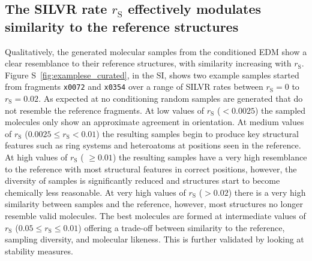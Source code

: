 \documentclass[journal=jacsat,manuscript=article]{achemso}
\begin{document}
\subsection{The SILVR rate $r_{\mathrm{S}}$ effectively modulates similarity to the reference structures}
Qualitatively, the generated molecular samples from the conditioned EDM  show a clear resemblance to their reference structures, with similarity increasing with $r_{\mathrm{S}}$. Figure S~\ref{fig:examplese_curated}, in the SI, shows two example samples started from fragments \texttt{x0072} and \texttt{x0354} over a range of SILVR rates between $r_{\mathrm{S}}=0$ to $r_{\mathrm{S}}=0.02$. As expected at no conditioning random samples are generated that do not resemble the reference fragments.  At low values of $r_{\mathrm{S}}$ ($< 0.0025$) the sampled molecules only show an approximate agreement in orientation. At medium values of $r_{\mathrm{S}}$ ($0.0025 \le r_{\mathrm{S}} < 0.01$) the resulting samples begin to produce key structural features such as ring systems and heteroatoms at positions seen in the reference. At high values of $r_{\mathrm{S}}$ ( $\ge 0.01$) the resulting samples have a very high resemblance to the reference with most structural features in correct positions, however, the diversity of samples is significantly reduced and structures start to become chemically less reasonable. At very high values of $r_{\mathrm{S}}$ ($> 0.02$) there is a very high similarity between samples and the reference, however, most structures no longer resemble valid molecules. The best molecules are formed at intermediate values of $r_{\mathrm{S}}$ ($0.05 \le r_{\mathrm{S}} \le 0.01$) offering a trade-off between similarity to the reference, sampling diversity, and molecular likeness. This is further validated by looking at stability measures. 
\end{document}
